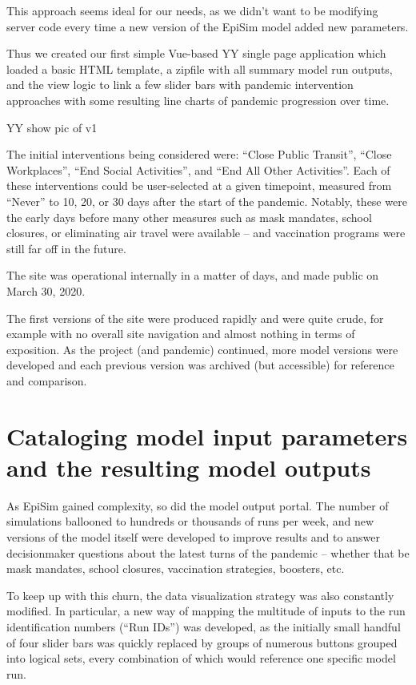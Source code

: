 This approach seems ideal for our needs, as we didn't want to be
modifying server code every time a new version of the EpiSim model added
new parameters.

Thus we created our first simple Vue-based YY single page application
which loaded a basic HTML template, a zipfile with all summary model run
outputs, and the view logic to link a few slider bars with pandemic
intervention approaches with some resulting line charts of pandemic
progression over time.

YY show pic of v1

The initial interventions being considered were: ``Close Public
Transit'', ``Close Workplaces'', ``End Social Activities'', and ``End
All Other Activities''. Each of these interventions could be
user-selected at a given timepoint, measured from ``Never'' to 10, 20,
or 30 days after the start of the pandemic. Notably, these were the
early days before many other measures such as mask mandates, school
closures, or eliminating air travel were available -- and vaccination
programs were still far off in the future.

The site was operational internally in a matter of days, and made public
on March 30, 2020.

The first versions of the site were produced rapidly and were quite
crude, for example with no overall site navigation and almost nothing in
terms of exposition. As the project (and pandemic) continued, more model
versions were developed and each previous version was archived (but
accessible) for reference and comparison.

\hypertarget{cataloging-model-input-parameters-and-the-resulting-model-outputs}{%
\section{Cataloging model input parameters and the resulting model
outputs}\label{cataloging-model-input-parameters-and-the-resulting-model-outputs}}

As EpiSim gained complexity, so did the model output portal. The number
of simulations ballooned to hundreds or thousands of runs per week, and
new versions of the model itself were developed to improve results and
to answer decisionmaker questions about the latest turns of the pandemic
-- whether that be mask mandates, school closures, vaccination
strategies, boosters, etc.

To keep up with this churn, the data visualization strategy was also
constantly modified. In particular, a new way of mapping the multitude
of inputs to the run identification numbers (``Run IDs'') was developed,
as the initially small handful of four slider bars was quickly replaced
by groups of numerous buttons grouped into logical sets, every
combination of which would reference one specific model run.

